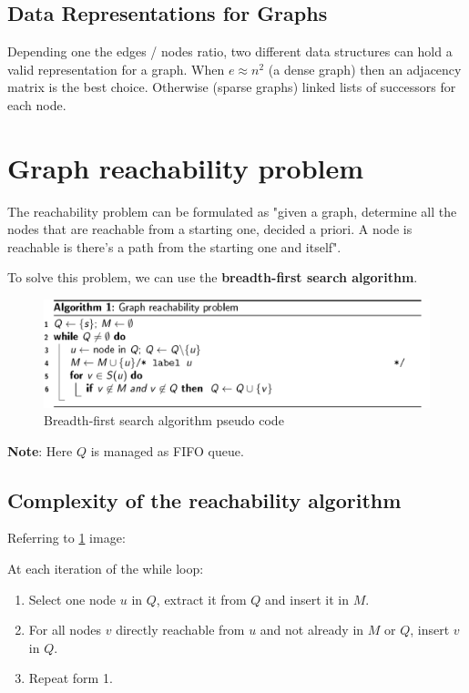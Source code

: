         \subsection*{Data Representations for Graphs}
            Depending one the edges / nodes ratio, two different data structures can hold a valid representation for a graph. When $e \approx n^2$ (a dense graph) then an adjacency matrix is the best choice. Otherwise (sparse graphs) linked lists of successors for each node.  

    \section{Graph reachability problem}
        The reachability problem can be formulated as "given a graph, determine all the nodes that are reachable from a starting one, decided a priori. A node is reachable is there's a path from the starting one and itself".
        
        To solve this problem, we can use the \textbf{breadth-first search algorithm}. 
        \begin{figure}[H]
        	\centering
        	\includegraphics[width = \textwidth]{./images/breadth-first-search.png}
            \caption{Breadth-first search algorithm pseudo code}
            \label{fig:breadthFirstSearchPseudoCode}
        \end{figure}
        \textbf{Note}: Here $Q$ is managed as FIFO queue.
        \subsection{Complexity of the reachability algorithm}
            Referring to \ref{fig:breadthFirstSearchPseudoCode} image:
            
            At each iteration of the while loop:
            \begin{enumerate}
                \item Select one node $u$ in $Q$, extract it from $Q$ and insert it in $M$.
                \item For all nodes $v$ directly reachable from $u$ and not already in $M$ or $Q$, insert $v$ in $Q$.
                \item Repeat form 1.
            \end{enumerate}
            
